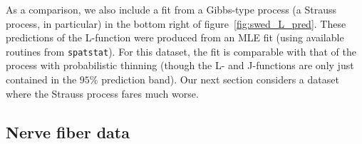 \documentclass{statsoc}
\begin{document}
As a comparison, we also include a fit from a Gibbs-type process (a Strauss process, in particular) in the bottom right of 
figure~\ref{fig:swed_L_pred}. These
predictions of the L-function were produced from an MLE fit (using available routines from \texttt{spatstat}). For this dataset, the fit is comparable with
that of the \matern process with probabilistic thinning (though the L- and J-functions are only just contained in the $95\%$ prediction
band). Our next section considers a dataset where the Strauss process fares much worse.
\subsection{Nerve fiber data}
\end{document}
